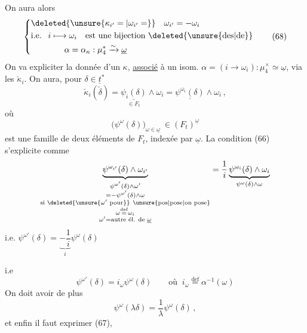 On aura alors
\[
\left\{\begin{aligned}
&\deleted{\unsure{\kappa_{i'}=|\omega_{i'}=}}\quad\omega_{i'}=-\omega_i\\
&\text{i.e. }\ i\longmapsto\omega_i\quad\text{est une bijection }\deleted{\unsure{\text{des}|\text{de}}}\\
&\hspace{4em}\alpha=\alpha_\kappa:\mu_4^*\xrightarrow{\sim}\underline\omega
\end{aligned}\right. \tag*{(68)}
\]
On va expliciter la donnée d'un $\kappa$, \uline{associé} à un isom.    $\alpha=(i\longrightarrow\omega_i):\mu_4^\times\simeq\underline\omega$, via les $\check\kappa_i$. On aura, pour $\delta\in\underline t^*$
\[
\check\kappa_i(\check\delta)=\underset{\in F_t}{\underline{\psi_i(\delta)}}\mathbin{\wedge}\omega_i
=\underline{\psi^{\omega_i}(\delta)}\mathbin{\wedge}\omega_i\,, \tag*{-(69)}
\]
où
\[
\bigl(\psi^\omega(\delta)\bigr)_{\omega\in\underline\omega}\ \in (F_t)^{\underline\omega} \tag*{(70)}
\]
est une famille de  deux éléments de $F_t$, indexée par $\underline\omega$. La condition  (66) s'explicite comme
\[
\underbrace{\psi^{\omega_{i'}}(\delta)\mathbin{\wedge}\omega_{i'}}_{
\substack{\psi^{\omega'}(\delta)\mathbin{\wedge}\omega'\\
=-\psi^{\omega'}(\delta)\mathbin{\wedge}\omega\\
\text{si }\deleted{\unsure{\omega'\text{ pour}}}\ \text{\unsure{pos|pose|on pose}}\\
\omega\overset{\mathrm{def}}{=}\omega_i\\
\omega'=\text{autre él. de }\underline\omega}}
=\frac1i\underbrace{\psi^{\omega_i}(\delta)\mathbin{\wedge}\omega_i}_{\psi^\omega(\delta)\mathbin{\wedge}\omega}
\]
i.e. $\psi^{\omega'}(\delta)=\underbrace{-\dfrac1i}_{i}\psi^\omega(\delta)$

i.e
\[
\psi^{\omega'}(\delta)=i_\omega\psi^\omega(\delta)
\qquad\text{où }\ i_\omega\overset{\mathrm{def}}{=}\alpha^{-1}(\omega) \tag*{(71)}
\]
On doit avoir de plus
\[
\psi^\omega(\lambda\delta)=\frac1\lambda\psi^\omega(\delta)\,, \tag*{(72)}
\]
 et enfin il faut exprimer (67),
